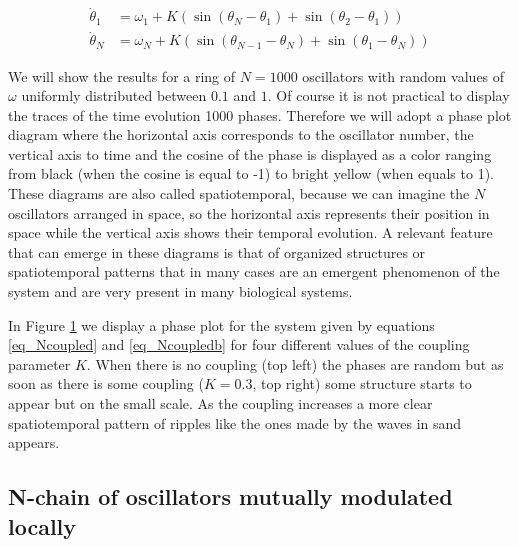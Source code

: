 \documentclass{article}
\begin{document}
\begin{subequations} \label{eq_Ncoupledb}
\begin{align} 
    \dot{\theta}_1 &= \omega_1 + K \left(\sin(\theta_{N}
    - \theta_1)+\sin(\theta_{2} - \theta_1)\right) \\  
     \dot{\theta}_N &= \omega_N + K \left(\sin(\theta_{N-1}
    - \theta_N)+\sin(\theta_{1} - \theta_N)\right)  
\end{align}
\end{subequations}

\begin{figure} [h]
    \centerline{}
    \caption{}
    \label{fig_noscoupled}
\end{figure}


We will show the results for a ring of $N=1000$ oscillators with random values of $\omega$ uniformly distributed between $0.1$ and $1$. Of course it is not practical to display the traces of the time evolution 1000 phases. 
Therefore we will adopt a phase plot diagram where the horizontal axis corresponds to the oscillator number, the vertical axis to time and the cosine of the phase is displayed as a color ranging from black (when the cosine is equal to -1) to bright yellow (when equals to 1). 
These diagrams are also called spatiotemporal, because we can imagine the $N$ oscillators arranged in space, so the horizontal axis represents their position in space while the vertical axis shows their temporal evolution. 
A relevant feature that can emerge in these diagrams is that of organized structures or spatiotemporal patterns that in many cases are an emergent phenomenon of the system and are very present in many biological systems.

In Figure \ref{fig_noscoupled} we display a phase plot for the system given by equations \ref{eq_Ncoupled} and \ref{eq_Ncoupledb} for four different values of the coupling parameter $K$. 
When there is no coupling (top left) the phases are random but as soon as there is some coupling ($K=0.3$, top right) some structure starts to appear but on the small scale. As the coupling increases a more clear spatiotemporal pattern of ripples like the ones made by the waves in sand appears. 



\subsection{N-chain of oscillators mutually modulated locally}
\end{document}
